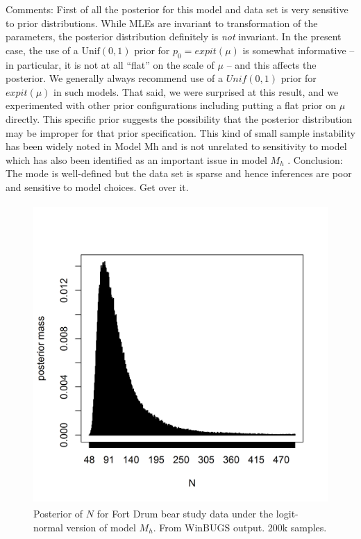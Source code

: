 Comments: First of all the posterior for this model and data set is
very sensitive to prior distributions. While MLEs are invariant to
transformation of the parameters, the posterior distribution
definitely is {\it not} invariant. In the present case, the use of a
$\mbox{Unif}(0,1)$ prior for $p_{0} = expit(\mu)$ is somewhat
informative -- in particular, it is not at all ``flat'' on the scale
of $\mu$ -- and this affects the posterior.  We generally always
recommend use of a $Unif(0,1)$ prior for $expit(\mu)$ in such
models. That said, we were surprised at this result, and we
experimented with other prior configurations including putting a flat
prior on $\mu$ directly. This specific prior suggests the possibility
that the posterior distribution may be improper for that prior
specification. This kind of small sample instability has been widely
noted in Model Mh \citep{fienberg_etal:1999, dorazio_royle:2003} and
is not unrelated to sensitivity to
model which has also been identified as an important issue in model
$M_{h}$ \citep{dorazio_royle:2003,link:2003}.
Conclusion: The mode is well-defined but the data set is sparse and
hence inferences are poor and sensitive to model choices. Get over it.


\begin{figure}
\centering
\includegraphics[height=4.5in,width=4.5in]{Ch3/figs/bear-modelMh-post}
\caption{Posterior of $N$ for Fort Drum bear study data under the
logit-normal version of model $M_h$. From WinBUGS output. 200k
samples.
}
\label{closed.fig.bearMh}
\end{figure}


